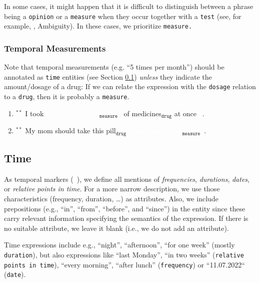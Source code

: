 \documentclass[12pt]{article}
\theoremstyle{definition}
\newcommand{\drug}[1]{\colorbox{brass}{#1$_{\texttt{drug}}$}}
\newcommand{\measure}[1]{\colorbox{bittersweet}{#1$_{\texttt{measure}}$}\ }
\newcommand{\timex}[2]{\colorbox{ashgrey}{#1$_{\texttt{time}}$}}
\newcommand{\timexDate}[2]{\colorbox{ashgrey}{#1$_{\texttt{time}}^{\textcolor{red}{date}}$}\ }
\newcommand{\dr}{\texttt{drug}\xspace}
\newcommand{\madeup}{$^{\ast\ast}$\xspace}
\begin{document}
In some cases, it might happen that it is difficult to distinguish between a phrase being a \texttt{opinion} or a \texttt{measure} when they occur together with a \texttt{test} (see, for example, , Ambiguity). 
In these cases, we prioritize \texttt{measure.}

\subsubsection*{Temporal Measurements}

Note that temporal measurements (e.g. ``5 times per month'') should be annotated as \texttt{time} entities (see Section \ref{ent_timex}) \textit{unless} they indicate the amount/dosage of a drug:
If we can relate the expression with the \texttt{dosage} relation to a \dr, then it is probably a \texttt{measure}.

\begin{enumerate}

\item \madeup I took \measure{\textcolor{white}{three days' worth}} of \drug{medicines} at once ~.

\item \madeup My mom should take this \drug{pill} \measure{\textcolor{white}{three times a day}}.
\end{enumerate}

\subsection{Time} \label{ent_timex}

As temporal markers (~), we define all mentions of \textit{frequencies}, \textit{durations}, \textit{dates}, or \textit{relative points in time}. 
For a more narrow description, we use those characteristics (frequency, duration, \ldots) as attributes.
Also, we include prepositions (e.g., ``in'', ``from'', ``before'', and ``since'') in the entity since these carry relevant information specifying the semantics of the expression.
If there is no suitable attribute, we leave it blank (i.e., we do not add an attribute).

Time expressions include e.g., ``night'', ``afternoon'', ``for one week'' (mostly \texttt{duration}), but also expressions like ``last Monday'', ``in two weeks'' (\texttt{relative points in time}), ``every morning'', ``after lunch'' (\texttt{frequency}) or ``11.07.2022`` (\texttt{date}).
\end{document}
